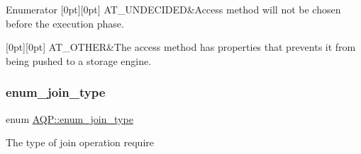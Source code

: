 \begin{DoxyEnumFields}{Enumerator}
[0pt][0pt]{}\mbox{\label{namespaceAQP_a4aaae4a1dc295a865368c9822d4dd0a5a9e9c8f946d0e4fd2ad7ab6b2006056fc}} 
A\+T\+\_\+\+U\+N\+D\+E\+C\+I\+D\+ED&Access method will not be chosen before the execution phase. \\
\hline

[0pt][0pt]{}\mbox{\label{namespaceAQP_a4aaae4a1dc295a865368c9822d4dd0a5af072c18eedd1c96cb1f56214d2fe1492}} 
A\+T\+\_\+\+O\+T\+H\+ER&The access method has properties that prevents it from being pushed to a storage engine. \\
\hline

\end{DoxyEnumFields}
\mbox{\label{namespaceAQP_a79358adf81977651643ef6c1672e18f8}} 
\subsubsection{\texorpdfstring{enum\+\_\+join\+\_\+type}{enum\_join\_type}}
{\footnotesize\ttfamily enum \mbox{\hyperlink{namespaceAQP_a79358adf81977651643ef6c1672e18f8}{A\+Q\+P\+::enum\+\_\+join\+\_\+type}}}

The type of join operation require 